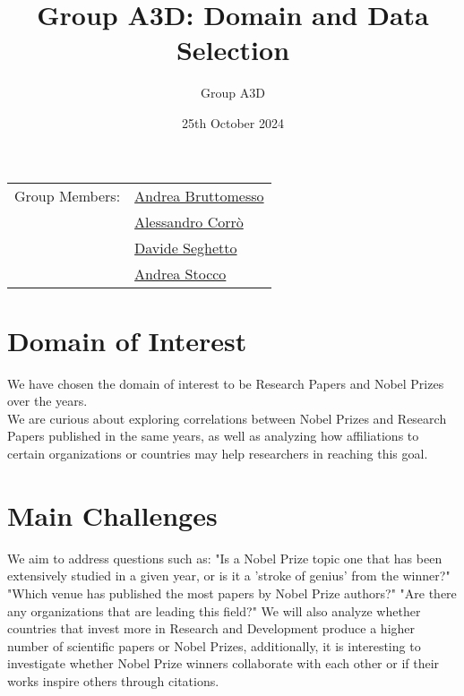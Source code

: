 \documentclass{article}
\title{Group A3D: Domain and Data Selection}
\author{Group A3D}
\date{25th October 2024}
\begin{document}
\maketitle

\noindent\begin{tabular}{@{}ll}
	Group Members: & \href{mailto:andrea.bruttomesso.1@studenti.unipd.it}{Andrea Bruttomesso} \\
	               & \href{mailto:alessandro.corro.1@studenti.unipd.it}{Alessandro Corr\`o}   \\
	               & \href{mailto:davide.seghetto@studenti.unipd.it}{Davide Seghetto}         \\
	               & \href{mailto:andrea.stocco.8@studenti.unipd.it}{Andrea Stocco}           \\
\end{tabular}

\section*{Domain of Interest}
We have chosen the domain of interest to be Research Papers and Nobel Prizes over the years.\\
We are curious about exploring correlations between Nobel Prizes and Research Papers published in the same years, 
as well as analyzing how affiliations to certain organizations or countries may help researchers in reaching this goal.

\section*{Main Challenges}
We aim to address questions such as: "Is a Nobel Prize topic one that has been extensively studied in a given year, 
or is it a 'stroke of genius' from the winner?" "Which venue has published the most papers by Nobel Prize authors?" 
"Are there any organizations that are leading this field?" We will also analyze whether countries that invest more in 
Research and Development produce a higher number of scientific papers or Nobel Prizes, additionally, it is interesting 
to investigate whether Nobel Prize winners collaborate with each other or if their works inspire others through citations.
\end{document}
